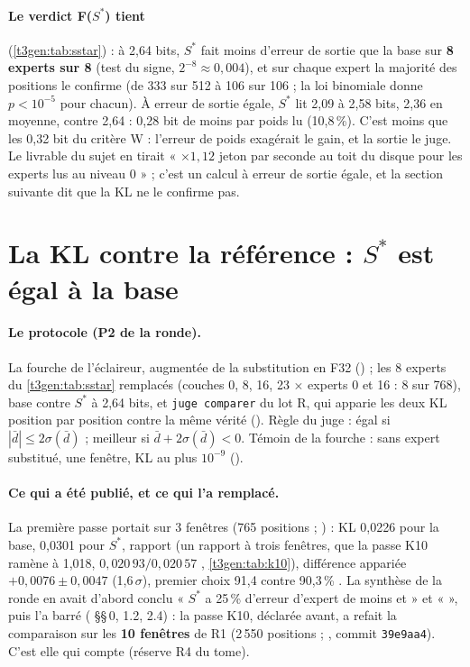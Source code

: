 \paragraph{Le verdict F($S^{*}$) tient} (\cref{t3gen:tab:sstar}) : à 2,64 bits, $S^{*}$ fait moins d'erreur de sortie que la base sur \textbf{8 experts sur 8} (test du signe, $2^{-8} \approx 0{,}004$), et sur chaque expert la majorité des positions le confirme (de 333 sur 512 à 106 sur 106 ; la loi binomiale donne $p < 10^{-5}$ pour chacun). À erreur de sortie égale, $S^{*}$ lit 2,09 à 2,58 bits, 2,36 en moyenne, contre 2,64 : 0,28 bit de moins par poids lu (10,8\,\%). C'est moins que les 0,32 bit du critère W : l'erreur de poids exagérait le gain, et la sortie le juge. Le livrable du sujet en tirait « $\times 1{,}12$ jeton par seconde au toit du disque pour les experts lus au niveau 0 » ; c'est un calcul à erreur de sortie égale, et la section suivante dit que la KL ne le confirme pas.

\section{La KL contre la référence : \texorpdfstring{$S^{*}$}{S*} est égal à la base}\label{t3gen:sec:kl}

\paragraph{Le protocole (P2 de la ronde).} La fourche de l'éclaireur, augmentée de la substitution en F32 () ; les 8 experts du \cref{t3gen:tab:sstar} remplacés (couches 0, 8, 16, 23 $\times$ experts 0 et 16 : 8 sur 768), base contre $S^{*}$ à 2,64 bits, et \texttt{juge comparer} du lot R, qui apparie les deux KL position par position contre la même vérité (). Règle du juge : égal si $|\bar d| \le 2\sigma(\bar d)$ ; meilleur si $\bar d + 2\sigma(\bar d) < 0$. Témoin de la fourche : sans expert substitué, une fenêtre, KL au plus $10^{-9}$ ().

\paragraph{Ce qui a été publié, et ce qui l'a remplacé.} La première passe portait sur 3 fenêtres (765 positions ; ) : KL 0,0226 pour la base, 0,0301 pour $S^{*}$, rapport  (un rapport à trois fenêtres, que la passe K10 ramène à 1,018, $0{,}020\,93/0{,}020\,57$ \calc, \cref{t3gen:tab:k10}), différence appariée $+0{,}0076 \pm 0{,}0047$ (1,6\,$\sigma$), premier choix 91,4 contre 90,3\,\% \mes. La synthèse de la ronde en avait d'abord conclu « $S^{*}$ a 25\,\% d'erreur d'expert de moins et  » et «  », puis l'a barré ( §§\,0, 1.2, 2.4) : la passe K10, déclarée avant, a refait la comparaison sur les \textbf{10 fenêtres} de R1 (2\,550 positions ; , commit \texttt{39e9aa4}). C'est elle qui compte (réserve R4 du tome).

